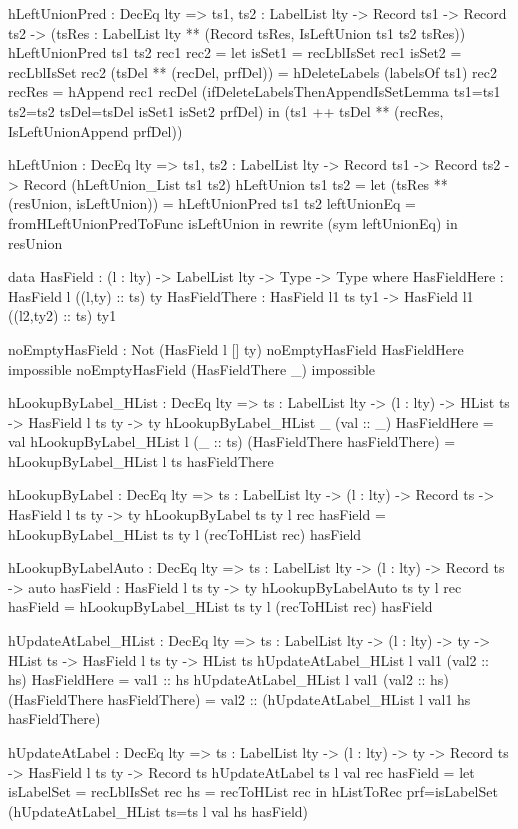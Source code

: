 \begin{code}
hLeftUnionPred : DecEq lty => {ts1, ts2 : LabelList lty} -> 
  Record ts1 -> Record ts2 ->
  (tsRes : LabelList lty ** 
    (Record tsRes, IsLeftUnion ts1 ts2 tsRes))
hLeftUnionPred {ts1} {ts2} rec1 rec2 = 
  let
    isSet1 = recLblIsSet rec1
    isSet2 = recLblIsSet rec2
    (tsDel ** (recDel, prfDel)) = hDeleteLabels (labelsOf ts1) rec2
    recRes = hAppend rec1 recDel 
      (ifDeleteLabelsThenAppendIsSetLemma {ts1=ts1} {ts2=ts2} 
      {tsDel=tsDel} isSet1 isSet2 prfDel)
   in
    (ts1 ++ tsDel ** (recRes, IsLeftUnionAppend prfDel))

hLeftUnion : DecEq lty => {ts1, ts2 : LabelList lty} -> 
  Record ts1 -> Record ts2 -> Record (hLeftUnion_List ts1 ts2)
hLeftUnion ts1 ts2 =
  let (tsRes ** (resUnion, isLeftUnion)) = hLeftUnionPred ts1 ts2
      leftUnionEq = fromHLeftUnionPredToFunc isLeftUnion
  in rewrite (sym leftUnionEq) in resUnion 

data HasField : (l : lty) -> LabelList lty -> Type -> Type where
  HasFieldHere : HasField l ((l,ty) :: ts) ty
  HasFieldThere : HasField l1 ts ty1 -> 
    HasField l1 ((l2,ty2) :: ts) ty1
  
noEmptyHasField : Not (HasField l [] ty)  
noEmptyHasField HasFieldHere impossible
noEmptyHasField (HasFieldThere _) impossible

hLookupByLabel_HList : DecEq lty => {ts : LabelList lty} -> 
  (l : lty) -> HList ts -> HasField l ts ty -> ty
hLookupByLabel_HList _ (val :: _) HasFieldHere = val
hLookupByLabel_HList l (_ :: ts) (HasFieldThere hasFieldThere) = 
  hLookupByLabel_HList l ts hasFieldThere

hLookupByLabel : DecEq lty => {ts : LabelList lty} -> (l : lty) -> 
  Record ts -> HasField l ts ty -> ty
hLookupByLabel {ts} {ty} l rec hasField = 
  hLookupByLabel_HList {ts} {ty} l (recToHList rec) hasField

hLookupByLabelAuto : DecEq lty => {ts : LabelList lty} -> 
  (l : lty) -> Record ts -> {auto hasField : HasField l ts ty} -> ty
hLookupByLabelAuto {ts} {ty} l rec {hasField} = 
  hLookupByLabel_HList {ts} {ty} l (recToHList rec) hasField

hUpdateAtLabel_HList : DecEq lty => {ts : LabelList lty} -> 
  (l : lty) -> ty -> HList ts -> HasField l ts ty -> HList ts
hUpdateAtLabel_HList l val1 (val2 :: hs) HasFieldHere = val1 :: hs
hUpdateAtLabel_HList l val1 (val2 :: hs) 
  (HasFieldThere hasFieldThere) = 
  val2 :: (hUpdateAtLabel_HList l val1 hs hasFieldThere)

hUpdateAtLabel : DecEq lty => {ts : LabelList lty} -> (l : lty) -> 
  ty -> Record ts -> HasField l ts ty -> Record ts
hUpdateAtLabel {ts} l val rec hasField =
  let
    isLabelSet = recLblIsSet rec
    hs = recToHList rec
  in
    hListToRec {prf=isLabelSet} 
      (hUpdateAtLabel_HList {ts=ts} l val hs hasField)
    

\end{code}
